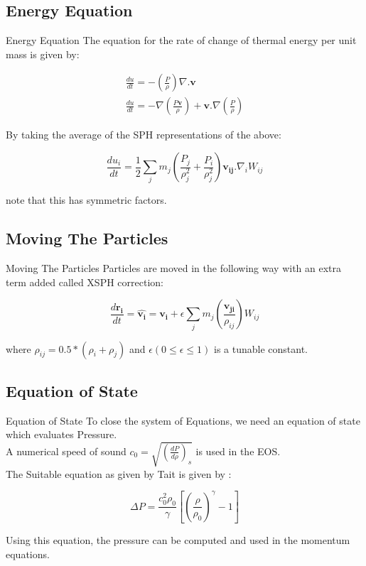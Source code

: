 \documentclass{beamer}
\begin{document}
\subsection{Energy Equation}
\begin{frame}{Energy Equation}
The equation for the rate of change of thermal energy per unit mass is given by:

\begin{eqnarray*}
 \frac{du}{dt} = -\left( \frac{P}{\rho} \right)\nabla. \mathbf{v} \\
 \frac{du}{dt} = -\nabla\left(\frac{P\mathbf{v}}{\rho}\right) + \mathbf{v}.\nabla\left(\frac{P}{\rho}\right)
 \end{eqnarray*}

\noindent
By taking the average of the SPH representations of the above:

\begin{equation*}
 \frac{du_i}{dt} = \frac{1}{2} \sum_j m_j \left( \frac{P_j}{\rho_j^2} + \frac{P_i}{\rho_j^2}\right)\mathbf{v_{ij}}.\nabla_i W_{ij}
\end{equation*}

\noindent
note that this has symmetric factors.

\end{frame}

\subsection{Moving The Particles}
\begin{frame}{Moving The Particles}
Particles are moved in the following way with an extra term added called XSPH correction:

\begin{equation*}
\frac{d\mathbf{r_i}}{dt} = \hat {\mathbf{v_i}} = \mathbf{v_i} + \epsilon \sum_j m_j \left(\frac{\mathbf{v_{ji}}}{\rho_{ij}}\right) W_{ij}
\end{equation*}

\noindent
where $\rho_{ij} = 0.5*(\rho_i + \rho_j)$ and $\epsilon (0 \leq \epsilon \leq 1)$ is a tunable constant. 
\end{frame}


\subsection{Equation of State}
\begin{frame}{Equation of State}
\justifying
To close the system of Equations, we need an equation of state which evaluates Pressure.\\
A numerical speed of sound
$c_0 = \sqrt{\left(\frac{dP}{d\rho}\right)_s}$ is used in the EOS.\\

The Suitable equation as given by Tait is given by :

\begin{equation*}
 \Delta P = \frac{c_0^2 \rho_0}{\gamma} \left[ \left( \frac{\rho}{\rho_0} \right)^{\gamma} - 1 \right]
\end{equation*}

\noindent
Using this equation, the pressure can be computed and used in the momentum equations.
\end{frame}
\end{document}
